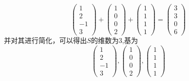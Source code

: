 \documentclass[onecolumn,oneside]{SUSTechHomework}
\begin{document}
  \[
    \begin{pmatrix} 1 \\ 2 \\ -1 \\ 3 \end{pmatrix} + \begin{pmatrix} 1 \\ 0 \\ 0 \\ 2 \end{pmatrix} + \begin{pmatrix} 1 \\ 1 \\ 1 \\ 1 \end{pmatrix} = \begin{pmatrix} 3 \\ 3 \\ 0 \\ 6 \end{pmatrix}
  \]
  并对其进行简化，可以得出\(S\)的维数为\(3\),基为
  \[ 
  \begin{pmatrix} 1 \\ 2 \\ -1 \\ 3 \end{pmatrix}, \begin{pmatrix} 1 \\ 0 \\ 0 \\ 2 \end{pmatrix}, \begin{pmatrix} 1 \\ 1 \\ 1 \\ 1 \end{pmatrix}
  \]

  \subsection{}
\end{document}
